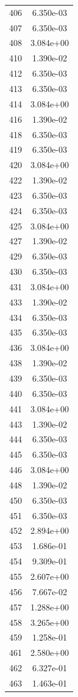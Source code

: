 \documentclass[12pt]{article}
\begin{document}
\begin{longtable}{@{}cc@{}}
406 & 6.350e-03 \\
407 & 6.350e-03 \\
408 & 3.084e+00 \\
410 & 1.390e-02 \\
412 & 6.350e-03 \\
413 & 6.350e-03 \\
414 & 3.084e+00 \\
416 & 1.390e-02 \\
418 & 6.350e-03 \\
419 & 6.350e-03 \\
420 & 3.084e+00 \\
422 & 1.390e-02 \\
423 & 6.350e-03 \\
424 & 6.350e-03 \\
425 & 3.084e+00 \\
427 & 1.390e-02 \\
429 & 6.350e-03 \\
430 & 6.350e-03 \\
431 & 3.084e+00 \\
433 & 1.390e-02 \\
434 & 6.350e-03 \\
435 & 6.350e-03 \\
436 & 3.084e+00 \\
438 & 1.390e-02 \\
439 & 6.350e-03 \\
440 & 6.350e-03 \\
441 & 3.084e+00 \\
443 & 1.390e-02 \\
444 & 6.350e-03 \\
445 & 6.350e-03 \\
446 & 3.084e+00 \\
448 & 1.390e-02 \\
450 & 6.350e-03 \\
451 & 6.350e-03 \\
452 & 2.894e+00 \\
453 & 1.686e-01 \\
454 & 9.309e-01 \\
455 & 2.607e+00 \\
456 & 7.667e-02 \\
457 & 1.288e+00 \\
458 & 3.265e+00 \\
459 & 1.258e-01 \\
461 & 2.580e+00 \\
462 & 6.327e-01 \\
463 & 1.463e-01 \\

\end{longtable}
\end{document}
